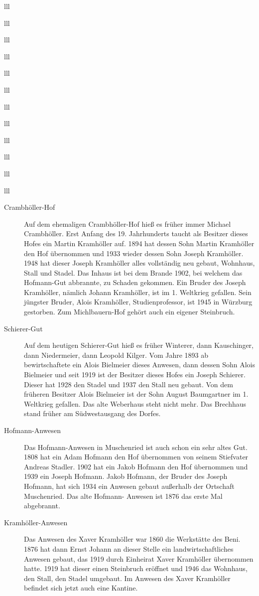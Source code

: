 \documentclass[12pt,a4pager]{book}
\begin{document}
\begin{tabuluar}{lll}
\begin{tabuluar}{lll}
\begin{tabuluar}{lll}
\begin{tabuluar}{lll}
\begin{tabuluar}{lll}
\begin{tabuluar}{lll}
\begin{tabuluar}{lll}
\begin{tabuluar}{lll}
\begin{tabuluar}{lll}
\begin{tabuluar}{lll}
\begin{tabuluar}{lll}
\begin{tabuluar}{lll}
\begin{description}
\item[Crambhöller-Hof] Auf dem ehemaligen Crambhöller-Hof hieß es früher immer
Michael Crambhöller. Erst Anfang des 19. Jahrhunderts taucht als Besitzer dieses
Hofes ein Martin Kramhöller auf. 1894 hat dessen Sohn Martin Kramhöller den Hof
übernommen und 1933 wieder dessen Sohn Joseph Kramhöller. 1948 hat dieser Joseph
Kramhöller alles vollständig neu gebaut, Wohnhaus, Stall und Stadel. Das Inhaus
ist bei dem Brande 1902, bei welchem das Hofmann-Gut abbrannte, zu Schaden
gekommen. Ein Bruder des Joseph Kramhöller, nämlich Johann Kramhöller, ist im 1.
Weltkrieg gefallen. Sein jüngster Bruder, Alois Kramhöller, Studienprofessor,
ist 1945 in Würzburg gestorben. Zum Michlbauern-Hof gehört auch ein eigener
Steinbruch.

\item[Schierer-Gut] Auf dem heutigen Schierer-Gut hieß es früher Winterer, dann
Kauschinger, dann Niedermeier, dann Leopold Kilger. Vom Jahre 1893 ab
bewirtschaftete ein Alois Bielmeier dieses Anwesen, dann dessen Sohn Alois
Bielmeier und seit 1919 ist der Besitzer dieses Hofes ein Joseph Schierer.
Dieser hat 1928 den Stadel und 1937 den Stall neu gebaut. Von dem früheren
Besitzer Alois Bielmeier ist der Sohn August Baumgartner im 1. Weltkrieg
gefallen. Das alte Weberhaus steht nicht mehr. Das Brechhaus stand früher am
Südwestausgang des Dorfes.

\item[Hofmann-Anwesen] Das Hofmann-Anwesen in Muschenried ist auch schon ein
sehr altes Gut. 1808 hat ein Adam Hofmann den Hof übernommen von seinem
Stiefvater Andreas Stadler. 1902 hat ein Jakob Hofmann den Hof übernommen und
1939 ein Joseph Hofmann. Jakob Hofmann, der Bruder des Joseph Hofmann, hat sich
1934 ein Anwesen gebaut außerhalb der Ortschaft Muschenried. Das alte Hofmann-
Anwesen ist 1876 das erste Mal abgebrannt.

\item[Kramhöller-Anwesen] Das Anwesen des Xaver Kramhöller war 1860 die
Werkstätte des Beni. 1876 hat dann Ernst Johann an dieser Stelle ein
landwirtschaftliches Anwesen gebaut, das 1919 durch Einheirat Xaver Kramhöller
übernommen hatte. 1919 hat dieser einen Steinbruch eröffnet und 1946 das
Wohnhaus, den Stall, den Stadel umgebaut. Im Anwesen des Xaver Kramhöller
befindet sich jetzt auch eine Kantine.


\end{description}
\end{tabuluar}
\end{tabuluar}
\end{tabuluar}
\end{tabuluar}
\end{tabuluar}
\end{tabuluar}
\end{tabuluar}
\end{tabuluar}
\end{tabuluar}
\end{tabuluar}
\end{tabuluar}
\end{tabuluar}
\end{document}
